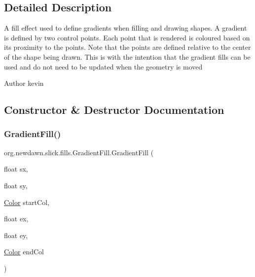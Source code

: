 \subsection{Detailed Description}
A fill effect used to define gradients when filling and drawing shapes. A gradient is defined by two control points. Each point that is rendered is coloured based on it\textquotesingle{}s proximity to the points. Note that the points are defined relative to the center of the shape being drawn. This is with the intention that the gradient fills can be used and do not need to be updated when the geometry is moved

\begin{DoxyAuthor}{Author}
kevin 
\end{DoxyAuthor}


\subsection{Constructor \& Destructor Documentation}
\mbox{\label{classorg_1_1newdawn_1_1slick_1_1fills_1_1_gradient_fill_ab207b90e95a7e51bcf6699fbd87d2420}} 
\subsubsection{\texorpdfstring{Gradient\+Fill()}{GradientFill()}\hspace{0.1cm}{\footnotesize\ttfamily [1/3]}}
{\footnotesize\ttfamily org.\+newdawn.\+slick.\+fills.\+Gradient\+Fill.\+Gradient\+Fill (\begin{DoxyParamCaption}\item[{float}]{sx,  }\item[{float}]{sy,  }\item[{\mbox{\hyperlink{classorg_1_1newdawn_1_1slick_1_1_color}{Color}}}]{start\+Col,  }\item[{float}]{ex,  }\item[{float}]{ey,  }\item[{\mbox{\hyperlink{classorg_1_1newdawn_1_1slick_1_1_color}{Color}}}]{end\+Col }\end{DoxyParamCaption})\hspace{0.3cm}{\ttfamily [inline]}}


